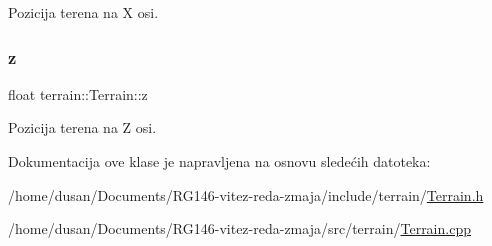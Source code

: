 Pozicija terena na X osi. 

\mbox{\label{classterrain_1_1Terrain_aaa4c36ce01096f81a0ee174c36f19657}} 
\subsubsection{\texorpdfstring{z}{z}}
{\footnotesize\ttfamily float terrain\+::\+Terrain\+::z\hspace{0.3cm}{\ttfamily [private]}}



Pozicija terena na Z osi. 



Dokumentacija ove klase je napravljena na osnovu sledećih datoteka\+:\begin{DoxyCompactItemize}
\item 
/home/dusan/\+Documents/\+R\+G146-\/vitez-\/reda-\/zmaja/include/terrain/\hyperlink{Terrain_8h}{Terrain.\+h}\item 
/home/dusan/\+Documents/\+R\+G146-\/vitez-\/reda-\/zmaja/src/terrain/\hyperlink{Terrain_8cpp}{Terrain.\+cpp}\end{DoxyCompactItemize}
